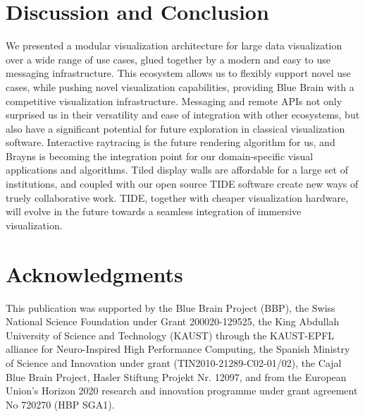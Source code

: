 \documentclass[10pt]{llncs}
\begin{document}
\section{Discussion and Conclusion}
\label{sec:conclusions}

We presented a modular visualization architecture for large data visualization
over a wide range of use cases, glued together by a modern and easy to use
messaging infrastructure. This ecosystem allows us to flexibly support novel use
cases, while pushing novel visualization capabilities, providing Blue Brain with
a competitive visualization infrastructure. Messaging and remote APIs not only
surprised us in their versatility and ease of integration with other ecosystems,
but also have a significant potential for future exploration in classical
visualization software. Interactive raytracing is the future rendering algorithm
for us, and Brayns is becoming the integration point for our domain-specific
visual applications and algorithms. Tiled display walls are affordable for a
large set of institutions, and coupled with our open source TIDE software create
new ways of truely collaborative work. TIDE, together with cheaper visualization
hardware, will evolve in the future towards a seamless integration of immersive
visualization.


\section*{Acknowledgments}
This publication was supported by the Blue Brain Project (BBP), the Swiss
National Science Foundation under Grant 200020-129525, the King Abdullah
University of Science and Technology (KAUST) through the KAUST-EPFL alliance for
Neuro-Inspired High Performance Computing, the Spanish Ministry of Science and
Innovation under grant (TIN2010-21289-C02-01/02), the Cajal Blue Brain Project,
Hasler Stiftung Projekt Nr. 12097, and from the European Union’s Horizon 2020
research and innovation programme under grant agreement No 720270 (HBP SGA1).





\end{document}
